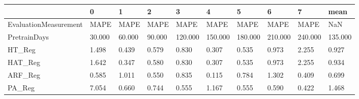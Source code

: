 \begin{tabular}{llllllllll}
\toprule
{} &      0 &      1 &      2 &       3 &       4 &       5 &       6 &       7 &    mean \\
\midrule
EvaluationMeasurement &   MAPE &   MAPE &   MAPE &    MAPE &    MAPE &    MAPE &    MAPE &    MAPE &     NaN \\
PretrainDays          & 30.000 & 60.000 & 90.000 & 120.000 & 150.000 & 180.000 & 210.000 & 240.000 & 135.000 \\
HT\_Reg                &  1.498 &  0.439 &  0.579 &   0.830 &   0.307 &   0.535 &   0.973 &   2.255 &   0.927 \\
HAT\_Reg               &  1.642 &  0.347 &  0.580 &   0.830 &   0.307 &   0.535 &   0.973 &   2.255 &   0.934 \\
ARF\_Reg               &  0.585 &  1.011 &  0.550 &   0.835 &   0.115 &   0.784 &   1.302 &   0.409 &   0.699 \\
PA\_Reg                &  7.054 &  0.660 &  0.744 &   0.555 &   1.167 &   0.555 &   0.590 &   0.422 &   1.468 \\
\bottomrule
\end{tabular}

